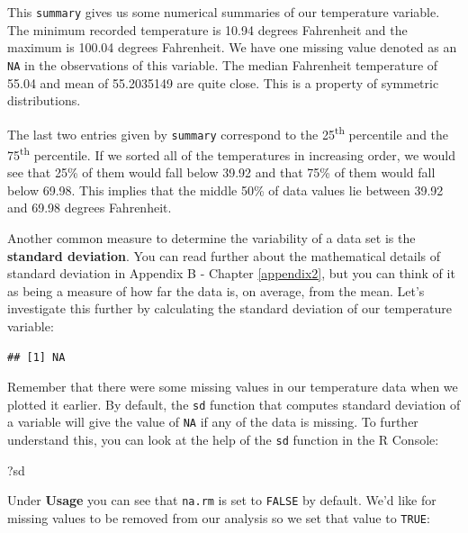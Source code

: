 \documentclass[]{tufte-book}
\newenvironment{Shaded}{\begin{snugshade}}{\end{snugshade}}
\newcommand{\KeywordTok}[1]{\textcolor[rgb]{0.13,0.29,0.53}{\textbf{{#1}}}}
\newcommand{\NormalTok}[1]{{#1}}
\begin{document}
This \texttt{summary} gives us some numerical summaries of our
temperature variable. The minimum recorded temperature is 10.94 degrees
Fahrenheit and the maximum is 100.04 degrees Fahrenheit. We have one
missing value denoted as an \texttt{NA} in the observations of this
variable. The median Fahrenheit temperature of 55.04 and mean of
55.2035149 are quite close. This is a property of symmetric
distributions.

The last two entries given by \texttt{summary} correspond to the
25\textsuperscript{th} percentile and the 75\textsuperscript{th}
percentile. If we sorted all of the temperatures in increasing order, we
would see that 25\% of them would fall below 39.92 and that 75\% of them
would fall below 69.98. This implies that the middle 50\% of data values
lie between 39.92 and 69.98 degrees Fahrenheit.

Another common measure to determine the variability of a data set is the
\textbf{standard deviation}. You can read further about the mathematical
details of standard deviation in Appendix B - Chapter \ref{appendix2},
but you can think of it as being a measure of how far the data is, on
average, from the mean. Let's investigate this further by calculating
the standard deviation of our temperature variable:

\begin{Shaded}
\end{Shaded}

\begin{verbatim}
## [1] NA
\end{verbatim}

Remember that there were some missing values in our temperature data
when we plotted it earlier. By default, the \texttt{sd} function that
computes standard deviation of a variable will give the value of
\texttt{NA} if any of the data is missing. To further understand this,
you can look at the help of the \texttt{sd} function in the R Console:

\begin{Shaded}
\begin{Highlighting}[]
\NormalTok{?sd}
\end{Highlighting}
\end{Shaded}

Under \textbf{Usage} you can see that \texttt{na.rm} is set to
\texttt{FALSE} by default. We'd like for missing values to be removed
from our analysis so we set that value to \texttt{TRUE}:
\end{document}
